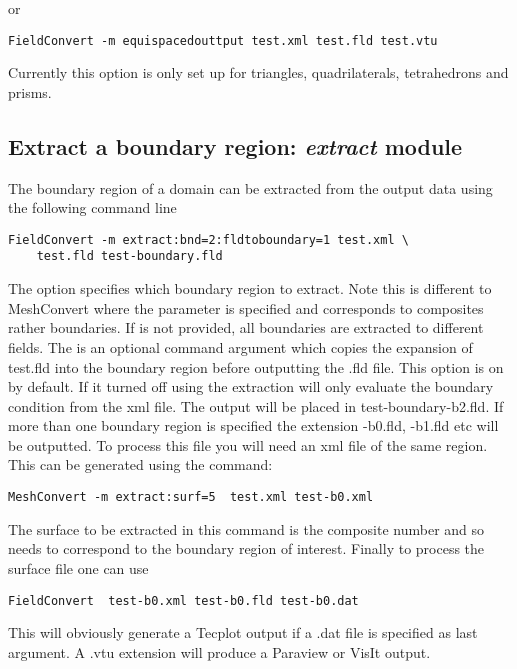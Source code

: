 or

\begin{lstlisting}[style=BashInputStyle]
FieldConvert -m equispacedouttput test.xml test.fld test.vtu
\end{lstlisting}


\begin{notebox} 
Currently this option is only set up for triangles, quadrilaterals,
tetrahedrons and prisms.
\end{notebox}

\subsection{Extract a boundary region: \textit{extract} module}
The boundary region of a domain can be extracted from the output 
data using the following command line
%
\begin{lstlisting}[style=BashInputStyle]
FieldConvert -m extract:bnd=2:fldtoboundary=1 test.xml \
	test.fld test-boundary.fld
\end{lstlisting}
%
The option  specifies which boundary region to extract. 
Note this is different to MeshConvert where the parameter  
is specified and corresponds to composites rather boundaries. If  
is not provided, all boundaries are extracted to different fields. The  
is an optional command argument which copies the expansion of test.fld into 
the boundary region before outputting the .fld file. This option is on by default. 
If it turned off using \inltt{fldtoboundary=0} the extraction will only evaluate the 
boundary condition from the xml file. The output will be placed in test-boundary-b2.fld. 
If more than one boundary region is specified the extension -b0.fld, -b1.fld etc will be 
outputted. To process this file you will need an xml file of the same region. 
This can be generated using the command:
%
\begin{lstlisting}[style=BashInputStyle]
MeshConvert -m extract:surf=5  test.xml test-b0.xml
\end{lstlisting}
%
The surface to be extracted in this command is the composite 
number and so needs to correspond to the boundary region 
of interest. Finally to process the surface file one can use
%
\begin{lstlisting}[style=BashInputStyle]
FieldConvert  test-b0.xml test-b0.fld test-b0.dat
\end{lstlisting}
%
This will obviously generate a Tecplot output if a .dat file 
is specified as last argument. A .vtu extension will produce 
a Paraview or VisIt output.
%
%
%
